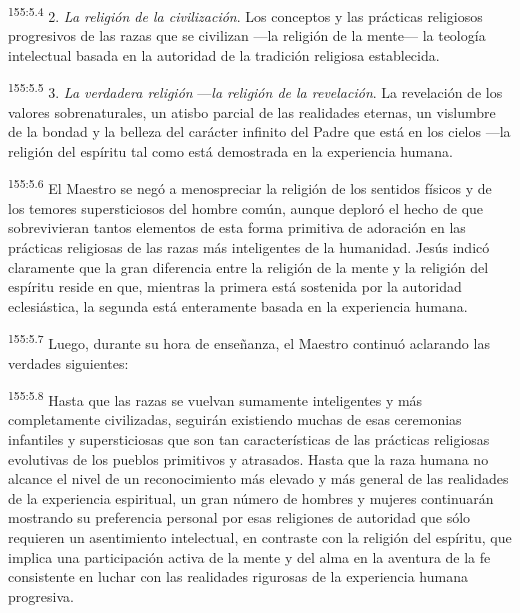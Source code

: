 \par 
\textsuperscript{155:5.4} 2. \textit{La religión de la civilización}. Los conceptos y las prácticas religiosos progresivos de las razas que se civilizan ---la religión de la mente--- la teología intelectual basada en la autoridad de la tradición religiosa establecida.

\par 
\textsuperscript{155:5.5} 3. \textit{La verdadera religión} ---\textit{la religión de la revelación}. La revelación de los valores sobrenaturales, un atisbo parcial de las realidades eternas, un vislumbre de la bondad y la belleza del carácter infinito del Padre que está en los cielos ---la religión del espíritu tal como está demostrada en la experiencia humana.

\par 
\textsuperscript{155:5.6} El Maestro se negó a menospreciar la religión de los sentidos físicos y de los temores supersticiosos del hombre común, aunque deploró el hecho de que sobrevivieran tantos elementos de esta forma primitiva de adoración en las prácticas religiosas de las razas más inteligentes de la humanidad. Jesús indicó claramente que la gran diferencia entre la religión de la mente y la religión del espíritu reside en que, mientras la primera está sostenida por la autoridad eclesiástica, la segunda está enteramente basada en la experiencia humana.

\par 
\textsuperscript{155:5.7} Luego, durante su hora de enseñanza, el Maestro continuó aclarando las verdades siguientes:

\par 
\textsuperscript{155:5.8} Hasta que las razas se vuelvan sumamente inteligentes y más completamente civilizadas, seguirán existiendo muchas de esas ceremonias infantiles y supersticiosas que son tan características de las prácticas religiosas evolutivas de los pueblos primitivos y atrasados. Hasta que la raza humana no alcance el nivel de un reconocimiento más elevado y más general de las realidades de la experiencia espiritual, un gran número de hombres y mujeres continuarán mostrando su preferencia personal por esas religiones de autoridad que sólo requieren un asentimiento intelectual, en contraste con la religión del espíritu, que implica una participación activa de la mente y del alma en la aventura de la fe consistente en luchar con las realidades rigurosas de la experiencia humana progresiva.

